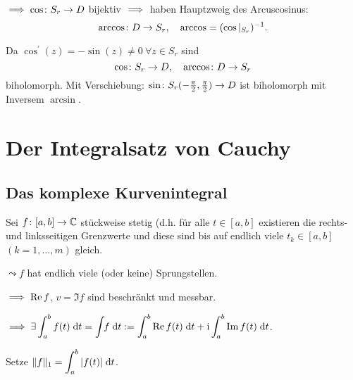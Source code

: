 \documentclass[a4paper,twoside,DIV15,BCOR12mm]{scrbook}
\begin{document}
$\implies\cos\colon S_r\rightarrow D$ bijektiv $\implies$ haben Hauptzweig des Arcuscosinus:
\[\arccos\colon D\rightarrow S_r,\quad\arccos = (\cos|_{S_r})^{-1}.\]

Da $\cos^\prime(z) = -\sin(z) \neq 0\ \forall z\in S_r$ sind
\[\cos\colon S_r\rightarrow D,\quad\arccos\colon D\rightarrow S_r\]
biholomorph. Mit Verschiebung: $\sin\colon S_r(-\frac{\pi}{2},\frac{\pi}{2})\rightarrow D$ ist biholomorph mit Inversem $\arcsin$.

\chapter{Der Integralsatz von Cauchy}
\section{Das komplexe Kurvenintegral}

Sei $f\colon [a,b]\rightarrow \mathbb{C}$ stückweise stetig (d.h. für alle $t\in[a,b]$ existieren die rechts- und linksseitigen Grenzwerte und diese sind bis auf endlich viele $t_k\in[a,b]$ $(k=1,\dotsc,m)$ gleich.

$\leadsto f$ hat endlich viele (oder keine) Sprungstellen.

$\implies\operatorname{Re}{f}$, $v=\Im{f}$ sind beschränkt und messbar.

$\displaystyle\implies\exists\int_{a}^{b}{f(t)}\;\mathrm{d} t = \int_{}^{}{\!\!f}\;\mathrm{d} t := \int_{a}^{b}{\operatorname{Re}{f(t)}}\;\mathrm{d} t + \mathrm{i}\int_{a}^{b}{\operatorname{Im}{f(t)}}\;\mathrm{d} t$.

Setze $\displaystyle \|f\|_1 = \int_{a}^{b}{|f(t)|}\;\mathrm{d} t$.
\end{document}
